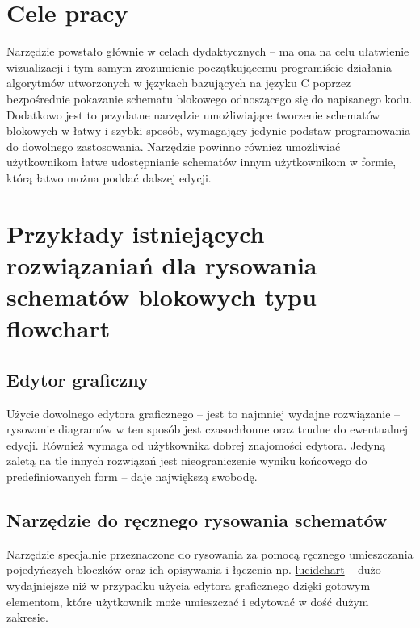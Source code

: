 \section{Cele pracy}
	Narzędzie powstało głównie w celach dydaktycznych -- ma ona na celu ułatwienie wizualizacji i tym samym zrozumienie początkującemu programiście działania algorytmów utworzonych w językach bazujących na języku C poprzez bezpośrednie pokazanie schematu blokowego odnoszącego się do napisanego kodu. Dodatkowo jest to przydatne narzędzie umożliwiające tworzenie schematów blokowych w łatwy i szybki sposób, wymagający jedynie podstaw programowania do dowolnego zastosowania. Narzędzie powinno również umożliwiać użytkownikom łatwe udostępnianie schematów innym użytkownikom w formie, którą łatwo można poddać dalszej edycji.
	
\section{Przykłady istniejących rozwiązaniań dla rysowania schematów blokowych typu flowchart}
	\subsection{Edytor graficzny} 
	Użycie dowolnego edytora graficznego -- jest to najmniej wydajne rozwiązanie -- rysowanie diagramów w ten sposób jest czasochłonne oraz trudne do ewentualnej edycji. Również wymaga od użytkownika dobrej znajomości edytora. Jedyną zaletą na tle innych rozwiązań jest nieograniczenie wyniku końcowego do predefiniowanych form -- daje największą swobodę.
		
	\subsection{Narzędzie do ręcznego rysowania schematów} 			
	Narzędzie specjalnie przeznaczone do rysowania za pomocą ręcznego umieszczania pojedyńczych bloczków oraz ich opisywania i łączenia np. \href{https://www.lucidchart.com/pages/examples/flowchart_software}{lucidchart} -- dużo wydajniejsze niż w przypadku użycia edytora graficznego dzięki gotowym elementom, które użytkownik może umieszczać i edytować w dość dużym zakresie.
		
